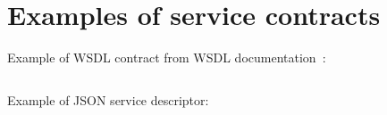 \section{Examples of service contracts}
\label{sec:appendix_service_contracts}

Example of WSDL contract from WSDL documentation~\cite{wsdl_language_spec}:
\inputminted[linenos=true,tabsize=4,fontsize=\footnotesize]{xml}{../source/service_contract/wsdl_example.xml}
\label{lst:wsdl_example}

Example of JSON service descriptor:
\inputminted[linenos=true,tabsize=4,fontsize=\footnotesize]{json}{../source/service_contract/service_schema.json}
\label{lst:json_contract_example}

	

